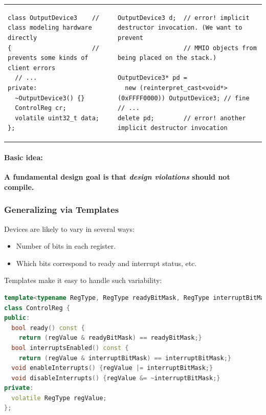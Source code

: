 \begin{tabular}{p{9.2cm}p{9.2cm}}
\begin{lstlisting}
class OutputDevice3    // class modeling hardware directly
{                      // prevents some kinds of client errors
  // ...
private:
  ~OutputDevice3() {}
  ControlReg cr;
  volatile uint32_t data;
};
\end{lstlisting}
&
\begin{lstlisting}
OutputDevice3 d;  // error! implicit destructor invocation. (We want to prevent
                  // MMIO objects from being placed on the stack.)

OutputDevice3* pd =
  new (reinterpret_cast<void*>(0xFFFF0000)) OutputDevice3; // fine
// ...
delete pd;        // error! another implicit destructor invocation
\end{lstlisting}
\end{tabular}

\paragraph{Basic idea:}
\textbf{A fundamental design goal is that \textit{design violations} should not compile.}

\subsubsection{Generalizing via Templates}
Devices are likely to vary in several ways:
\begin{itemize}
  \item Number of bits in each register.
  \item Which bits correspond to ready and interrupt status, etc.
\end{itemize}
Templates make it easy to handle such variability:
\begin{lstlisting}[language=C++]
template<typename RegType, RegType readyBitMask, RegType interruptBitMask>
class ControlReg {
public:
  bool ready() const {
    return (regValue & readyBitMask) == readyBitMask;}
  bool interruptsEnabled() const {
    return (regValue & interruptBitMask) == interruptBitMask;}
  void enableInterrupts() {regValue |= interruptBitMask;}
  void disableInterrupts() {regValue &= ~interruptBitMask;}
private:
  volatile RegType regValue;
};
\end{lstlisting}

